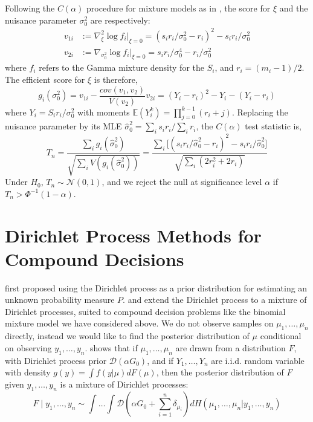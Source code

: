 \documentclass[12pt]{amsart}
\begin{document}
{Following the $C(\alpha)$ procedure for mixture models as in , 
the score for $\xi$ and the nuisance parameter $\sigma_{0}^{2}$ are respectively:
\[
\begin{array}{ll}
v_{1i} & := \nabla_{\xi}^{2} \log f_{i} |_{\xi=0} = (s_{i} r_{i}/\sigma_{0}^{2} - r_{i})^{2} - s_{i} r_{i} / \sigma_{0}^{2}\\
v_{2i} & := \nabla_{\sigma_{0}^{2}} \log f_{i} | _{\xi =0} = s_{i}r_{i}/\sigma_{0}^{4} - r_{i}/\sigma_{0}^{2}
\end{array}
\]
where $f_{i}$ refers to the Gamma mixture density for the $S_{i}$, and $r_i = (m_i - 1)/2 $.
The efficient score for $\xi$ is therefore, 
\[
g_{i}(\sigma_{0}^{2})  = v_{1i}- \frac{cov(v_{1}, v_{2})}{V(v_{2})} v_{2i}  
= (Y_{i} - r_{i})^{2} - Y_{i} - (Y_{i}-r_{i})
\]
where $Y_{i} = S_{i}r_{i}/\sigma_{0}^{2}$ with moments 
$\mathbb{E}(Y_{i}^{k})= \prod _{j=0}^{k-1} (r_{i} +j)$. 
Replacing the nuisance parameter by its MLE 
$\hat \sigma_{0}^{2} = \sum_{i} s_{i} r_{i} / \sum_{i} r_{i}$, the $C(\alpha)$ test statistic is,
\[
T_{n}  =  \frac{\sum_{i} g_{i}(\hat \sigma_{0}^{2})}{\sqrt{\sum_{i} V(g_{i}(\hat \sigma_{0}^{2}))}} = \frac{\sum_{i} \Big [ (s_{i}r_{i}/\hat \sigma_{0}^{2} - r_{i})^{2} - s_{i} r_{i} /\hat \sigma_{0}^{2} \Big ] }{\sqrt{ \sum_{i} (2 r_{i}^{2} + 2 r_{i})}}
\]
Under $H_{0}$, $T_{n} \sim \mathcal{N}(0,1)$, 
and we reject the null at significance level $\alpha$ if $T_{n} >  \Phi^{-1}(1-\alpha)$. 
\section{Dirichlet Process Methods for Compound Decisions}


 first proposed using the Dirichlet process as a prior distribution 
for estimating an unknown probability measure $P$. 
 and  extend the Dirichlet process to a 
mixture of Dirichlet processes, suited to compound decision problems like the binomial mixture 
model we have considered above. We do not observe samples on $\mu_{1}, \dots, \mu_{n}$ directly, 
instead we would like to find the posterior distribution of $\mu$ conditional on observing 
$y_{1}, \dots, y_{n}$.  shows that if $\mu_{1}, \dots, \mu_{n}$ are 
drawn from a distribution $F$, with Dirichlet process prior $\mathcal{D}(\alpha G_{0})$, 
and if $Y_{1}, \dots, Y_{n}$ are i.i.d. random variable with density 
$g(y)=\int f(y | \mu) dF(\mu)$, then the posterior distribution of $F$ given 
$y_{1}, \dots, y_{n}$ is a mixture of Dirichlet processes:
\[
F \mid y_{1}, \dots, y_{n} \sim \int \dots \int \mathcal{D}(\alpha G_{0} + \sum_{i=1}^{n} \delta_{\mu_{i}}) dH(\mu_{1}, \dots, \mu_{n} | y_{1}, \dots, y_{n})
\]

}
\end{document}
